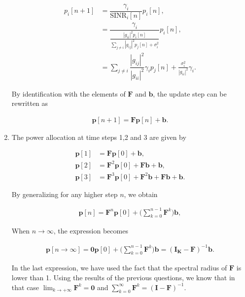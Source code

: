 \documentclass [a4paper, 11pt] {article}
\begin{document}
\begin{solution}
\begin{enumerate}
    \begin{align}
        p_i[n+1] &= \dfrac{\gamma_i}{\text{SINR}_i[n]}p_i[n],\\
        &= \dfrac{\gamma_i}{\frac{|g_{ii}|^2p_i[n]}{ \sum_{j\neq i} |g_{ij}|^2p_j[n] + \sigma_i^2}}p_i[n],\\
        &= \sum_{j\neq i} \dfrac{|g_{ij}|^2}{|g_{ii}|^2}\gamma_i p_j[n] + \frac{\sigma_i^2}{|g_{ii}|^2} \gamma_i.
    \end{align}
    
    By identification with the elements of $\mathbf{F}$ and $\mathbf{b}$, the update step can be rewritten as 
    
    \begin{align}
        \mathbf{p}[n+1] = \mathbf{F} \mathbf{p}[n] + \mathbf{b}.
    \end{align}
    
    \item The power allocation at time steps 1,2 and 3 are given by 
    
    \begin{align}
    \mathbf{p}[1] &= \mathbf{F} \mathbf{p}[0] + \mathbf{b}, \\
    \mathbf{p}[2] &= \mathbf{F}^2 \mathbf{p}[0] + \mathbf{F} \mathbf{b} + \mathbf{b}, \\
    \mathbf{p}[3] &= \mathbf{F}^3 \mathbf{p}[0] + \mathbf{F}^2 \mathbf{b} + \mathbf{F} \mathbf{b} +\mathbf{b}.
    \end{align}
    
    By generalizing for any higher step $n$, we obtain
    
    \begin{align}
    \mathbf{p}[n] = \mathbf{F}^{n} \mathbf{p}[0] + \Bigg(\sum_{k=0}^{n-1} \mathbf{F}^k \Bigg) \mathbf{b},
    \end{align}
    
    When $n \rightarrow \infty$, the expression becomes 
    
    \begin{align}
    \mathbf{p}[n \rightarrow \infty] = \mathbf{0} \mathbf{p}[0] + \Bigg(\sum_{k=0}^{n-1} \mathbf{F}^k \Bigg) \mathbf{b} = (\mathbf{I_K} - \mathbf{F})^{-1}\mathbf{b}.
    \end{align}
    
    In the last expression, we have used the fact that the spectral radius of $\mathbf{F}$ is lower than 1. Using the results of the previous questions, we know that in that case $\lim_{k\rightarrow + \infty} \mathbf{F}^k = \mathbf{0}$ and $\sum_{k=0}^{\infty} \mathbf{F}^k = (\mathbf{I} - \mathbf{F})^{-1}$.
    

\end{enumerate}
\end{solution}
\end{document}
